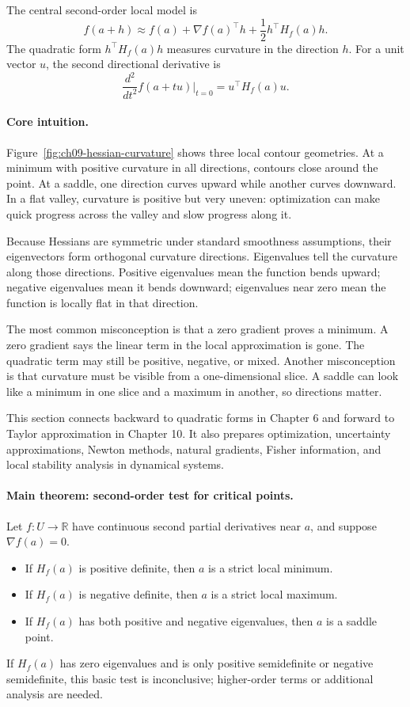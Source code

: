The central second-order local model is
\[
f(a+h)\approx f(a)+\nabla f(a)^\top h+\frac{1}{2}h^\top H_f(a)h.
\]
The quadratic form \(h^\top H_f(a)h\) measures curvature in the direction \(h\). For a unit vector \(u\), the second directional derivative is
\[
\frac{d^2}{dt^2}f(a+t u)\bigg|_{t=0}=u^\top H_f(a)u.
\]

\paragraph{Core intuition.}
Figure~\ref{fig:ch09-hessian-curvature} shows three local contour geometries. At a minimum with positive curvature in all directions, contours close around the point. At a saddle, one direction curves upward while another curves downward. In a flat valley, curvature is positive but very uneven: optimization can make quick progress across the valley and slow progress along it.

Because Hessians are symmetric under standard smoothness assumptions, their eigenvectors form orthogonal curvature directions. Eigenvalues tell the curvature along those directions. Positive eigenvalues mean the function bends upward; negative eigenvalues mean it bends downward; eigenvalues near zero mean the function is locally flat in that direction.

The most common misconception is that a zero gradient proves a minimum. A zero gradient says the linear term in the local approximation is gone. The quadratic term may still be positive, negative, or mixed. Another misconception is that curvature must be visible from a one-dimensional slice. A saddle can look like a minimum in one slice and a maximum in another, so directions matter.

This section connects backward to quadratic forms in Chapter 6 and forward to Taylor approximation in Chapter 10. It also prepares optimization, uncertainty approximations, Newton methods, natural gradients, Fisher information, and local stability analysis in dynamical systems.

\paragraph{Main theorem: second-order test for critical points.}
Let \(f:U\to\mathbb{R}\) have continuous second partial derivatives near \(a\), and suppose \(\nabla f(a)=0\).
\begin{itemize}[leftmargin=*]
\item If \(H_f(a)\) is positive definite, then \(a\) is a strict local minimum.
\item If \(H_f(a)\) is negative definite, then \(a\) is a strict local maximum.
\item If \(H_f(a)\) has both positive and negative eigenvalues, then \(a\) is a saddle point.
\end{itemize}
If \(H_f(a)\) has zero eigenvalues and is only positive semidefinite or negative semidefinite, this basic test is inconclusive; higher-order terms or additional analysis are needed.

